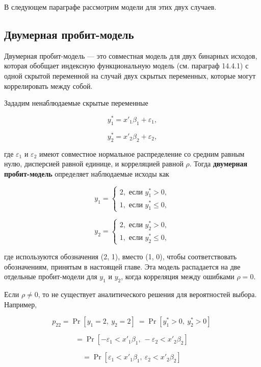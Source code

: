 В следующем параграфе рассмотрим модели для этих двух случаев.

\subsection{Двумерная пробит-модель}

Двумерная пробит-модель --- это совместная модель для двух бинарных исходов, которая обобщает индексную функциональную модель (см. параграф 14.4.1) с одной скрытой переменной на случай двух скрытых переменных, которые могут коррелировать между собой.

Зададим ненаблюдаемые скрытые переменные

\begin{equation} \label{GrindEQ__15_51_} y^*_1=x'_1{\beta }_1+{\varepsilon }_1, \end{equation} 

\[y^*_2=x'_2{\beta }_2+{\varepsilon }_2,\] 

где ${\varepsilon }_1$ и ${\varepsilon }_2$ имеют совместное нормальное распределение со средним равным нулю, дисперсией равной единице, и корреляцией равной $\rho $. Тогда \textbf{двумерная пробит-модель } определяет наблюдаемые исходы как

\[y_1=\left\{ \begin{array}{c}
2,\text{ если } y^*_1>0, \\ 
1,\text{ если } y^*_1\le 0, \end{array}
\right.\] 

\[y_2=\left\{ \begin{array}{c}
2,\text{ если } y^*_2>0, \\ 
1,\text{ если } y^*_2\le 0, \end{array}
\right.\] 

где используются обозначения (2, 1), вместо (1, 0), чтобы соответствовать обозначениям, принятым в настоящей главе. Эта модель распадается на две отдельные пробит-модели для $y_1$ и $y_2$, когда корреляция между ошибками $\rho =0$.

Если $\rho \ne 0$, то не существует аналитического решения для вероятностей выбора. Например,

\[{p}_{22}={\Pr  \left[y_1=2,\ y_2=2\right]\ }={\Pr  \left[y^*_1>0,\ y^*_2>0\right]\ }\] 

\[={\Pr  \left[-{\varepsilon }_1<x'_1{\beta }_1,\ -{\varepsilon }_2<x'_2{\beta }_2\right]\ }\] 

\[={\Pr  \left[{\varepsilon }_1<x'_1{\beta }_1,\ {\varepsilon }_2<x'_2{\beta }_2\right]\ }\] 

